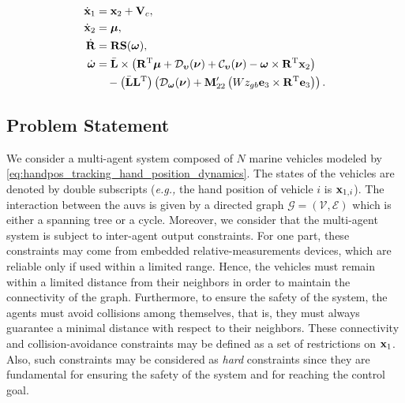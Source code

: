 \vspace*{-1.7em}

\begin{subequations}
    \begin{align}
        \dot{\mathbf{x}}_1 &= \mathbf{x}_2 + \mathbf{V}_c, \label{eq:handpos_tracking_x_1_dot_transformed}\\
        \dot{\mathbf{x}}_2 &= \bm{\mu}, \label{eq:handpos_tracking_x_2_dot_transformed}\\
        \dot{\mathbf{R}} &= \mathbf{R}\mathbf{S}(\bm{\omega}), \label{eq:handpos_tracking_R_dot_CL} \\
        \dot{\bm{\omega}} &= \Bar{\mathbf{L}} \times \left(\mathbf{R}^{\mathrm{T}}\bm{\mu} + \mathcal{D}_{\bm{\upsilon}}(\bm{\nu}) + \mathcal{C}_{\bm{\upsilon}}(\bm{\nu}) - \bm{\omega} \times \mathbf{R}^{\mathrm{T}} \mathbf{x}_2\right) \label{eq:handpos_tracking_omega_dot_CL} \\
            & \quad - \left(\Bar{\mathbf{L}}\mathbf{L}^{\mathrm{T}}\right) \left(\mathcal{D}_{\bm{\omega}}(\bm{\nu}) + \mathbf{M}_{22}^{\prime}\left(Wz_{gb} \mathbf{e}_3 \times \mathbf{R}^{\mathrm{T}} \mathbf{e}_3\right)\right). \nonumber
    \end{align} \label{eq:handpos_tracking_hand_position_dynamics}
\end{subequations}

\subsection{Problem Statement}

We consider a multi-agent system composed of $N$ marine vehicles modeled by \eqref{eq:handpos_tracking_hand_position_dynamics}.
The states of the vehicles are denoted by double subscripts (\emph{e.g.,} the hand position of vehicle $i$ is $\mathbf{x}_{1, i}$).
The interaction between the \glspl{auv} is given by a directed graph $\mathcal{G}=(\mathcal{V},\mathcal{E})$ which is either a spanning tree or a cycle.
Moreover, we consider that the multi-agent system is subject to inter-agent output constraints.
For one part, these constraints may come from embedded relative-measurements devices, which are reliable only if used within a limited range. Hence, the vehicles must remain within a limited distance from their neighbors in order to maintain the connectivity of the graph.
Furthermore, to ensure the safety of the system, the agents must avoid collisions among themselves, that is, they must always guarantee a minimal distance with respect to their neighbors.
These connectivity and collision-avoidance constraints may be defined as a set of restrictions on $\mathbf{x}_1$. Also, such constraints may be considered as \emph{hard} constraints since they are fundamental for ensuring the safety of the system and for reaching the control goal.

